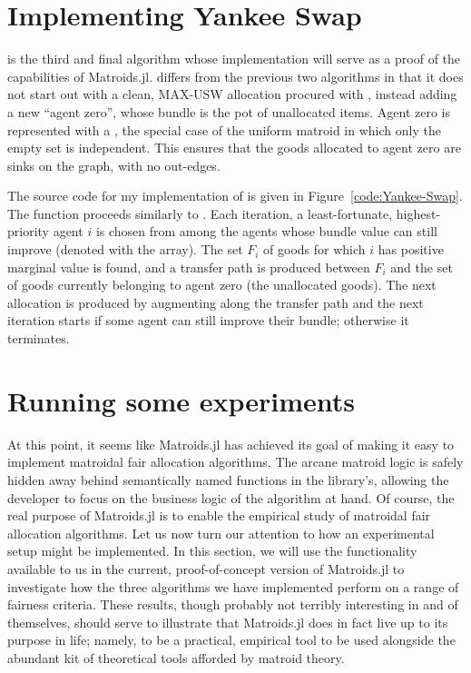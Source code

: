 \section{Implementing Yankee Swap}
 is the third and final algorithm whose implementation will serve as a proof of the capabilities of Matroids.jl.  differs from the previous two algorithms in that it does not start out with a clean, MAX-USW allocation procured with , instead adding a new ``agent zero'', whose bundle is the pot of unallocated items. Agent zero is represented with a , the special case of the uniform matroid in which only the empty set is independent. This ensures that the goods allocated to agent zero are sinks on the graph, with no out-edges.

The source code for my implementation of  is given in Figure~\ref{code:Yankee-Swap}. The function proceeds similarly to . Each iteration, a least-fortunate, highest-priority agent $i$ is chosen from among the agents whose bundle value can still improve (denoted with the  array). The set $F_i$ of goods for which $i$ has positive marginal value is found, and a transfer path is produced between $F_i$ and the set of goods currently belonging to agent zero (the unallocated goods). The next allocation is produced by augmenting along the transfer path and the next iteration starts if some agent can still improve their bundle; otherwise it terminates.


\section{Running some experiments}
\label{chap:results}
At this point, it seems like Matroids.jl has achieved its goal of making it easy to implement matroidal fair allocation algorithms. The arcane matroid logic is safely hidden away behind semantically named functions in the library's, allowing the developer to focus on the business logic of the algorithm at hand. Of course, the real purpose of Matroids.jl is to enable the empirical study of matroidal fair allocation algorithms. Let us now turn our attention to how an experimental setup might be implemented. In this section, we will use the functionality available to us in the current, proof-of-concept version of Matroids.jl to investigate how the three algorithms we have implemented perform on a range of fairness criteria. These results, though probably not terribly interesting in and of themselves, should serve to illustrate that Matroids.jl does in fact live up to its purpose in life; namely, to be a practical, empirical tool to be used alongside the abundant kit of theoretical tools afforded by matroid theory.

